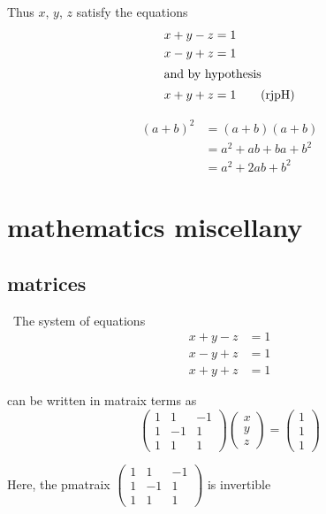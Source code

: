 \documentclass[a4paper, UTF8]{article}
\begin{document}
Thus $x$, $y$, $z$ satisfy the equations
\begin{align*}
    x+y-z & =1\\
    x-y+z & =1\\
    \intertext{and by hypothesis}
    x+y+z & =1\tag{rjpH}
\end{align*}

\begin{equation}
    \begin{split}
        (a+b)^2 & =(a+b)(a+b)\\
                & =a^2+ab+ba+b^2\\
                & = a^2+2ab+b^2
    \end{split}
\end{equation}

\section{mathematics miscellany}
\subsection{matrices}
\quad\ The system of equations
\begin{align*}
    x+y-z & =1\\
    x-y+z & =1\\
    x+y+z & =1
\end{align*}

can be written in matraix terms as 
\begin{equation*}
    \begin{pmatrix}
        1 & 1 & -1\\
        1 & -1 & 1\\
        1 & 1 & 1
    \end{pmatrix}
    \begin{pmatrix}
        x\\
        y\\
        z
    \end{pmatrix}
    =
    \begin{pmatrix}
        1\\
        1\\
        1
    \end{pmatrix}
\end{equation*}

Here, the pmatraix
$\begin{pmatrix}
1 & 1 & -1\\
1 & -1 & 1\\
1 & 1 & 1
\end{pmatrix}$
is invertible
\end{document}
